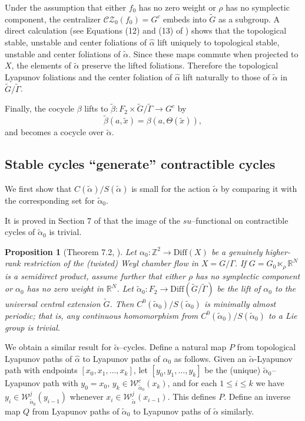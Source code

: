 \documentclass[11pt]{amsart}
\numberwithin{equation}{section}
\newcommand{\R}{\mathbb{R}}
\newcommand{\Z}{\mathbb{Z}}
\newcommand{\CZ}{\mathcal{CZ}}
\theoremstyle{plain}
\newtheorem{prop}[thm]{Proposition}
\begin{document}
Under the assumption that either $f_0$ has no zero weight or
$\rho$ has no symplectic component, the centralizer
$\CZ_0(f_0)=G^c$ embeds into $\tilde G$ as a subgroup. A direct
calculation (see Equations (12) and (13) of \cite{VinWang}) shows that
the topological stable, unstable and center foliations of $\hat\alpha$
lift uniquely to topological stable, unstable and center foliations of
$\tilde\alpha$. Since these maps commute when projected to $X$, the
elements of $\tilde\alpha$ preserve the lifted foliations. Therefore the
topological Lyapunov foliations and the center foliation of $\hat\alpha$
lift naturally to those of $\tilde\alpha$ in $\tilde G/\tilde\Gamma$.

Finally, the cocycle $\beta$ lifts to
$\tilde\beta:F_2\times\tilde G/\tilde\Gamma\to G^c$ by
\[
\tilde\beta(a,\tilde x)=\beta(a,\Theta(\tilde x)),
\]
and becomes a cocycle over $\tilde\alpha$.



\subsection{Stable cycles ``generate'' contractible cycles}

We first show that $C(\tilde\alpha)/S(\tilde\alpha)$ is small for the
action $\tilde\alpha$ by comparing it with the corresponding set for
$\tilde\alpha_0$.

It is proved in Section 7 of \cite{VinWang} that the image of the
$su$–functional on contractible cycles of $\tilde\alpha_0$ is trivial.

\begin{prop}[Theorem 7.2, \cite{VinWang}]\label{minper}
Let $\alpha_0:\Z^2\to\mathrm{Diff}(X)$ be a genuinely higher-rank restriction of the
(twisted) Weyl chamber flow in $X=G/\Gamma$. If
$G=G_0\ltimes_\rho\R^N$ is a semidirect product, assume further that
either $\rho$ has no symplectic component or $\alpha_0$ has no zero
weight in $\R^N$. Let $\tilde\alpha_0: F_2\to \mathrm{Diff}(\tilde G/\tilde \Gamma)$ be the lift of $\alpha_0$ to the
universal central extension $\tilde G$. Then
$C^0(\tilde\alpha_0)/S(\tilde\alpha_0)$ is minimally almost periodic;
that is, any continuous homomorphism from
$C^0(\tilde\alpha_0)/S(\tilde\alpha_0)$ to a Lie group is trivial.
\end{prop}



We obtain a similar result for $\tilde\alpha$–cycles. Define a natural
map $P$ from topological Lyapunov paths of $\hat\alpha$ to Lyapunov
paths of $\alpha_0$ as follows. Given an $\tilde\alpha$-Lyapunov path
with endpoints $[x_0,x_1,\dots,x_k]$, let $[y_0,y_1,\dots,y_k]$ be the
(unique) $\tilde\alpha_0$–Lyapunov path with $y_0=x_0$, $y_k\in
\mathcal W^c_{\tilde\alpha_0}(x_k)$, and for each $1\le i\le k$ we have
$y_i\in\mathcal W^j_{\tilde\alpha_0}(y_{i-1})$ whenever
$x_i\in\mathcal W^j_{\tilde\alpha}(x_{i-1})$. This defines $P$. Define
an inverse map $Q$ from Lyapunov paths of $\tilde\alpha_0$ to Lyapunov
paths of $\tilde\alpha$ similarly.
\end{document}
